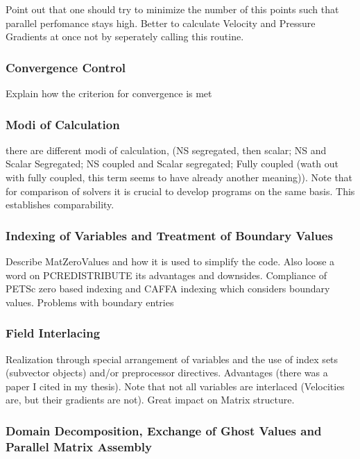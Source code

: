 \documentclass[article,type=msc,colorback,accentcolor=tud2a]{tudthesis}
\begin{document}
        Point out that one should try to minimize the number of this points such that parallel perfomance stays high. Better to calculate Velocity and Pressure Gradients at once not by seperately calling this routine.

        \subsubsection{Convergence Control} 
        Explain how the criterion for convergence is met 

        \subsubsection{Modi of Calculation}
          there are different modi of calculation, (NS segregated, then scalar; NS and Scalar Segregated; NS coupled and Scalar segregated; Fully coupled (wath out with fully coupled, this term seems to have already another meaning)). Note that for comparison of solvers it is crucial to develop programs on the same basis. This establishes comparability.

      \subsubsection{Indexing of Variables and Treatment of Boundary Values}
      Describe MatZeroValues and how it is used to simplify the code. Also loose a word on PCREDISTRIBUTE its advantages and downsides. Compliance of PETSc zero based indexing and CAFFA indexing which considers boundary values. Problems with boundary entries
      \subsubsection{Field Interlacing}
      Realization through special arrangement of variables and the use of index sets (subvector objects) and/or preprocessor directives. Advantages (there was a paper I cited in my thesis). Note that not all variables are interlaced (Velocities are, but their gradients are not). Great impact on Matrix structure.
      \subsubsection{Domain Decomposition, Exchange of Ghost Values and Parallel Matrix Assembly}
\end{document}
